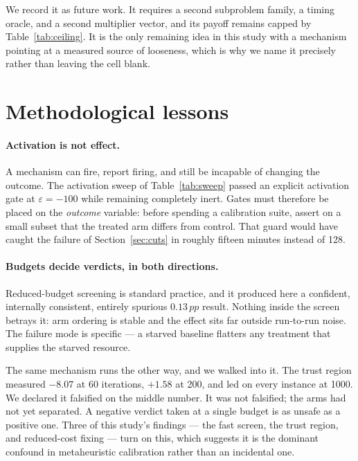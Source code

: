\documentclass[11pt,a4paper]{article}
\newcommand{\pp}{\,pp}
\begin{document}
We record it as future work. It requires a second subproblem family, a timing
oracle, and a second multiplier vector, and its payoff remains capped by
Table~\ref{tab:ceiling}. It is the only remaining idea in this study with a
mechanism pointing at a measured source of looseness, which is why we name it
precisely rather than leaving the cell blank.

\section{Methodological lessons}\label{sec:lessons}

\paragraph{Activation is not effect.}
A mechanism can fire, report firing, and still be incapable of changing the
outcome. The activation sweep of Table~\ref{tab:sweep} passed an explicit
activation gate at $\varepsilon=-100$ while remaining completely inert. Gates must
therefore be placed on the \emph{outcome} variable: before spending a calibration
suite, assert on a small subset that the treated arm differs from control. That
guard would have caught the failure of Section~\ref{sec:cuts} in roughly fifteen
minutes instead of 128.

\paragraph{Budgets decide verdicts, in both directions.}
Reduced-budget screening is standard practice, and it produced here a confident,
internally consistent, entirely spurious $0.13\pp$ result. Nothing inside the
screen betrays it: arm ordering is stable and the effect sits far outside
run-to-run noise. The failure mode is specific --- a starved baseline flatters any
treatment that supplies the starved resource.

The same mechanism runs the other way, and we walked into it. The trust region
measured $-8.07$ at 60 iterations, $+1.58$ at 200, and led on every instance at
1000. We declared it falsified on the middle number. It was not falsified; the
arms had not yet separated. A negative verdict taken at a single budget is as
unsafe as a positive one. Three of this study's findings --- the fast screen, the
trust region, and reduced-cost fixing --- turn on this, which suggests it is the
dominant confound in metaheuristic calibration rather than an incidental one.
\end{document}
